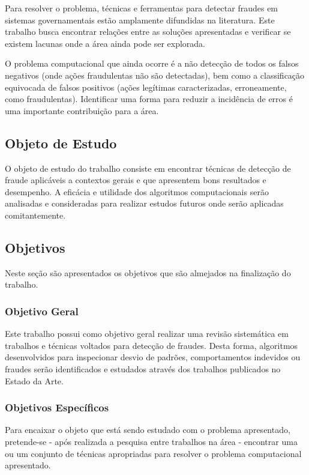 \documentclass[smallextended]{svjour3}       %
\begin{document}
Para resolver o problema, técnicas e ferramentas para detectar fraudes em sistemas governamentais estão amplamente difundidas na literatura. Este trabalho busca encontrar relações entre as soluções apresentadas e verificar se existem lacunas onde a área ainda pode ser explorada.

O problema computacional que ainda ocorre é a não detecção de todos os falsos negativos (onde ações fraudulentas não são detectadas), bem como a classificação equivocada de falsos positivos (ações legítimas caracterizadas, erroneamente, como fraudulentas). Identificar uma forma para reduzir a incidência de erros é uma importante contribuição para a área. 

\subsection{Objeto de Estudo}
O objeto de estudo do trabalho consiste em encontrar técnicas de detecção de fraude aplicáveis a contextos gerais e que apresentem bons resultados e desempenho. A eficácia e utilidade dos algoritmos computacionais serão analisadas e consideradas para realizar estudos futuros onde serão aplicadas comitantemente.

\subsection{Objetivos}
Neste seção são apresentados os objetivos que são almejados na finalização do trabalho.

\subsubsection{Objetivo Geral}
Este trabalho possui como objetivo geral realizar uma revisão sistemática em trabalhos e técnicas voltados para detecção de fraudes. Desta forma, algoritmos desenvolvidos para inspecionar desvio de padrões, comportamentos indevidos ou fraudes serão identificados e estudados através dos trabalhos publicados no Estado da Arte.

\subsubsection{Objetivos Específicos}

Para encaixar o objeto que está sendo estudado com o problema apresentado, pretende-se - após realizada a pesquisa entre trabalhos na área - encontrar uma ou um conjunto de técnicas apropriadas para resolver o problema computacional apresentado.
\end{document}
